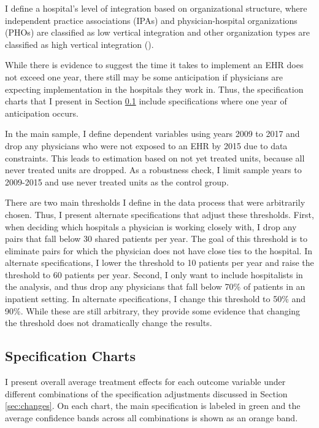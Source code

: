 \documentclass[12pt]{article}
\begin{document}
I define a hospital's level of integration based on organizational structure, where independent practice associations (IPAs) and physician-hospital organizations (PHOs) are classified as low vertical integration and other organization types are classified as high vertical integration (\cite{dynan1998assessing}). 



While there is evidence to suggest the time it takes to implement an EHR does not exceed one year, there still may be some anticipation if physicians are expecting implementation in the hospitals they work in. Thus, the specification charts that I present in Section \ref{sec:chart} include specifications where one year of anticipation occurs. 


In the main sample, I define dependent variables using years 2009 to 2017 and drop any physicians who were not exposed to an EHR by 2015 due to data constraints. This leads to estimation based on not yet treated units, because all never treated units are dropped. As a robustness check, I limit sample years to 2009-2015 and use never treated units as the control group. 

There are two main thresholds I define in the data process that were arbitrarily chosen. Thus, I present alternate specifications that adjust these thresholds. First, when deciding which hospitals a physician is working closely with, I drop any pairs that fall below 30 shared patients per year. The goal of this threshold is to eliminate pairs for which the physician does not have close ties to the hospital. In alternate specifications, I lower the threshold to 10 patients per year and raise the threshold to 60 patients per year. Second, I only want to include hospitalists in the analysis, and thus drop any physicians that fall below 70\% of patients in an inpatient setting. In alternate specifications, I change this threshold to 50\% and 90\%. While these are still arbitrary, they provide some evidence that changing the threshold does not dramatically change the results. 


\subsection{Specification Charts}\label{sec:chart}

I present overall average treatment effects for each outcome variable under different combinations of the specification adjustments discussed in Section \ref{sec:changes}. On each chart, the main specification is labeled in green and the average confidence bands across all combinations is shown as an orange band. 
\end{document}
